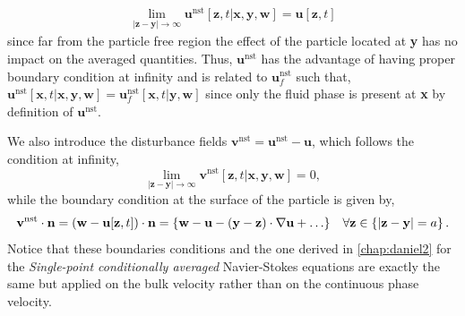 \begin{align*}
    \lim_{|\textbf{z} - \textbf{y}|\to \infty}
    \textbf{u}^\text{nst}[\textbf{z},t|\textbf{x},\textbf{y},\textbf{w}]
    = \textbf{u}[\textbf{z},t]
    \label{eq:boundary}
\end{align*}
since far from the particle free region the effect of the particle located at \textbf{y} has no impact on the averaged quantities. 
Thus, $\textbf{u}^\text{nst}$ has the advantage of having proper boundary condition at infinity and is related to $\textbf{u}_f^\text{nst}$ such that, $\textbf{u}^\text{nst}[\textbf{x},t|\textbf{x},\textbf{y},\textbf{w}] = \textbf{u}_f^\text{nst}[\textbf{x},t|\textbf{y},\textbf{w}]$ since only the fluid phase is present at \textbf{x} by definition of $\textbf{u}^\text{nst}$. 

We also introduce the disturbance fields $\textbf{v}^\text{nst} = \textbf{u}^\text{nst} - \textbf{u}$, which follows the condition at infinity, 
\begin{equation}
    \lim_{|\textbf{z} - \textbf{y}|\to \infty}
    \textbf{v}^\text{nst}[\textbf{z},t|\textbf{x},\textbf{y},\textbf{w}]
    = 0,
\end{equation}
while the boundary condition at the surface of the particle is given by, 
\begin{equation}
    \textbf{v}^\text{nst}\cdot \textbf{n}
    = 
    (\textbf{w} - \textbf{u}[\textbf{z},t])\cdot \textbf{n}
    = 
    \left\{
        \textbf{w}
        - \textbf{u}
        - (\textbf{y} - \textbf{z})\cdot \grad\textbf{u}
        + \ldots 
    \right\}
    \;\;\; \forall \textbf{z}\in \left\{ |\textbf{z} - \textbf{y}| = a  \right\}. 
    \label{eq:bounday2}
\end{equation}
Notice that these boundaries conditions and the one derived in \ref{chap:daniel2} for the \textit{Single-point conditionally averaged} Navier-Stokes equations  are exactly the same but applied on the bulk velocity rather than on the continuous phase velocity.


